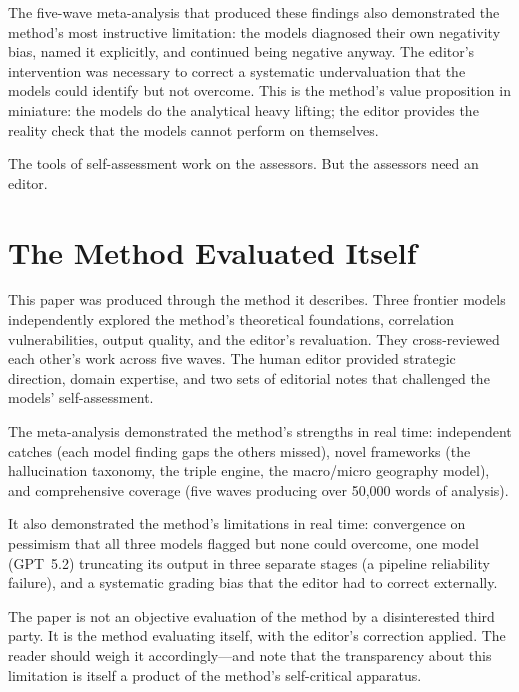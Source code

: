 \documentclass[11pt,letterpaper]{article}
\begin{document}
The five-wave meta-analysis that produced these findings also demonstrated the method's most instructive limitation: the models diagnosed their own negativity bias, named it explicitly, and continued being negative anyway. The editor's intervention was necessary to correct a systematic undervaluation that the models could identify but not overcome. This is the method's value proposition in miniature: the models do the analytical heavy lifting; the editor provides the reality check that the models cannot perform on themselves.

The tools of self-assessment work on the assessors. But the assessors need an editor.

\appendix
\section{The Method Evaluated Itself}

This paper was produced through the method it describes. Three frontier models independently explored the method's theoretical foundations, correlation vulnerabilities, output quality, and the editor's revaluation. They cross-reviewed each other's work across five waves. The human editor provided strategic direction, domain expertise, and two sets of editorial notes that challenged the models' self-assessment.

The meta-analysis demonstrated the method's strengths in real time: independent catches (each model finding gaps the others missed), novel frameworks (the hallucination taxonomy, the triple engine, the macro/micro geography model), and comprehensive coverage (five waves producing over 50,000 words of analysis).

It also demonstrated the method's limitations in real time: convergence on pessimism that all three models flagged but none could overcome, one model (GPT~5.2) truncating its output in three separate stages (a pipeline reliability failure), and a systematic grading bias that the editor had to correct externally.

The paper is not an objective evaluation of the method by a disinterested third party. It is the method evaluating itself, with the editor's correction applied. The reader should weigh it accordingly---and note that the transparency about this limitation is itself a product of the method's self-critical apparatus.
\end{document}
